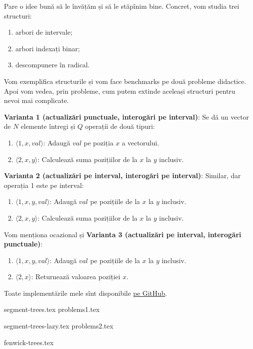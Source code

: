 Pare o idee bună să le învățăm și să le stăpînim bine.  Concret, vom studia trei structuri:

\begin{enumerate}
  \item arbori de intervale;
  \item arbori indexați binar;
  \item descompunere în radical.
\end{enumerate}

Vom exemplifica structurile și vom face benchmarks pe două probleme didactice. Apoi vom vedea, prin probleme, cum putem extinde aceleași structuri pentru nevoi mai complicate.

\textbf{Varianta 1 (actualizări punctuale, interogări pe interval)}: Se dă un vector de $N$ elemente întregi și $Q$ operații de două tipuri:

\begin{enumerate}
  \item $\langle 1, x, val \rangle$: Adaugă $val$ pe poziția $x$ a vectorului.
  \item $\langle 2, x, y \rangle$: Calculează suma pozițiilor de la $x$ la $y$ inclusiv.
\end{enumerate}

\textbf{Varianta 2 (actualizări pe interval, interogări pe interval)}: Similar, dar operația 1 este pe interval:

\begin{enumerate}
  \item $\langle 1, x, y, val \rangle$: Adaugă $val$ pe pozițiile de la $x$ la $y$ inclusiv.
  \item $\langle 2, x, y \rangle$: Calculează suma pozițiilor de la $x$ la $y$ inclusiv.
\end{enumerate}

Vom menționa ocazional și \textbf{Varianta 3 (actualizări pe interval, interogări punctuale)}:

\begin{enumerate}
  \item $\langle 1, x, y, val \rangle$: Adaugă $val$ pe pozițiile de la $x$ la $y$ inclusiv.
  \item $\langle 2, x \rangle$: Returnează valoarea poziției $x$.
\end{enumerate}

Toate implementările mele sînt disponibile \href{https://github.com/CatalinFrancu/nerdvana/tree/main/query-update}{pe GitHub}.

\begin{refsection}
  {segment-trees.tex}
  {problems1.tex}

  \nocite{cpa-segtree}
  \nocite{csa-segtree}
  \printbibliography
\end{refsection}

\begin{refsection}
  {segment-trees-lazy.tex}
  {problems2.tex}
\end{refsection}

\begin{refsection}
  {fenwick-trees.tex}
\end{refsection}
